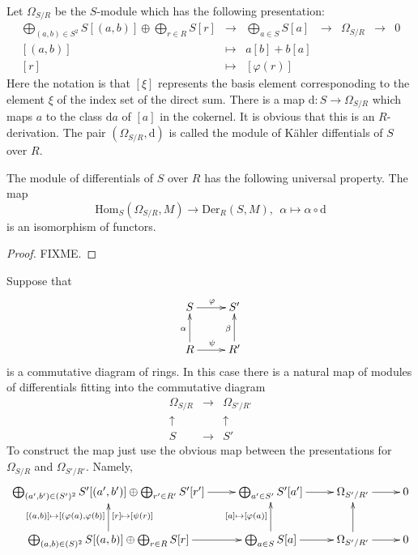 \medskip\noindent
Let $\Omega_{S/R}$ be the $S$-module which has the
following presentation:
$$
\begin{matrix}
\bigoplus_{(a,b)\in S^2} S[(a,b)] \oplus \bigoplus_{r\in R} S[r]
&
\to
&
\bigoplus_{a\in S} S [a]
&
\to
&
\Omega_{S/R}
&
\to
&
0
\\
[(a,b)]
&
\mapsto
&
a[b] + b[a]
&
&
&
&
\\
[r]
&
\mapsto
&
[\varphi(r)]
&
&
&
&
\end{matrix}
$$
Here the notation is that $[\xi]$ represents the basis
element corresponoding to the element $\xi$ of the index set
of the direct sum. There is a map $\text{d} : S \to \Omega_{S/R}$
which maps $a$ to the class $\text{d}a$ of $[a]$ in the cokernel.
It is obvious that this is an $R$-derivation.
The pair $(\Omega_{S/R}, \text{d})$ is called the module
of K\"ahler diffentials of $S$ over $R$.

\begin{lemma}
\label{lemma-universal-omega}
The module of differentials of $S$ over $R$ has the following
universal property. The map
$$
\text{Hom}_S(\Omega_{S/R}, M)
\longrightarrow
\text{Der}_R(S, M),\ \ 
\alpha 
\longmapsto
\alpha \circ \text{d}
$$
is an isomorphism of functors.
\end{lemma}

\begin{proof}
FIXME.
\end{proof}

\noindent
Suppose that
$$
\xymatrix{
S \ar[r]^\varphi
&
S'
\\
R \ar[r]^\psi \ar[u]^\alpha
&
R' \ar[u]^\beta
}
$$
is a commutative diagram of rings. In this case there is a
natural map of modules of differentials fitting into the
commutative diagram
$$
\begin{matrix}
\Omega_{S/R}
&
\longrightarrow
&
\Omega_{S'/R'}
\\
\uparrow
&
&
\uparrow
\\
S
&
\longrightarrow
&
S'
\end{matrix}
$$
To construct the map just use the obvious map
between the presentations for $\Omega_{S/R}$ and $\Omega_{S'/R'}$.
Namely,
$$
\xymatrix{
\bigoplus_{(a',b')\in (S')^2} S'[(a',b')]
\oplus
\bigoplus_{r'\in R'} S'[r'] \ar[r]
&
\bigoplus_{a'\in S'} S' [a'] \ar[r]
&
\Omega_{S'/R'} \ar[r]
&
0
\\
\bigoplus_{(a,b)\in (S)^2} S[(a,b)]
\oplus
\bigoplus_{r\in R} S[r] \ar[r]
\ar[u]^{[(a,b)] \mapsto [(\varphi(a),\varphi(b)]}_{[r]\mapsto [\psi(r)]}
&
\bigoplus_{a\in S} S[a] \ar[r] \ar[u]^{[a] \mapsto [\varphi(a)]}
&
\Omega_{S'/R'} \ar[r] \ar[u]
&
0
}
$$

